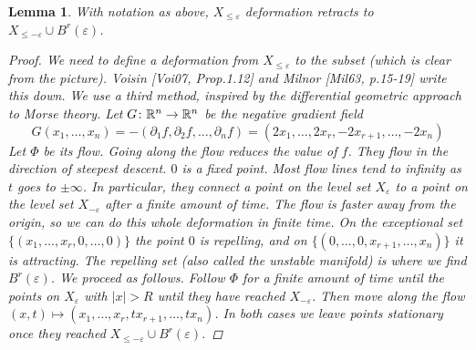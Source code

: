 \documentclass[A4paper, british]{amsart}
\theoremstyle{darkgreentheorem}
\newtheorem{lm}[thm]{Lemma}
\theoremstyle{darkbluedefinition}
\theoremstyle{darkredexample}
\theoremstyle{remark}
\newcommand{\1}{\mathbbm{1}}
\begin{document}
\begin{lm}
    With notation as above, $X_{\leqslant \varepsilon}$ deformation retracts to $X_{\leqslant -\varepsilon }\cup B^{r}(\varepsilon)$.
    \begin{proof}
	We need to define a deformation from $X_{\leqslant \varepsilon}$ to the subset (which is clear from the picture).
	Voisin [Voi07, Prop.1.12] and Milnor [Mil63, p.15-19] write this down.
	We use a third method, inspired by the differential geometric approach to Morse theory.
	Let $G\colon \mathbb{R}^{n}\to \mathbb{R}^{n}$ be the negative gradient field
	\[ G(x_{1},\ldots,x_{n})=-(\partial_{1} f,\partial_{2} f,\ldots, \partial_{n} f)=(2x_{1},\ldots,2x_{r},-2x_{r+1},\ldots,-2x_{n}) \]
	Let $\Phi$ be its flow.
	Going along the flow reduces the value of $f$.
	They flow in the direction of steepest descent.
	$0$ is a fixed point.
	Most flow lines tend to infinity as $t$ goes to $\pm \infty$.
	In particular, they connect a point on the level set $X_{\varepsilon}$ to a point on the level set $X_{-\varepsilon}$ after a finite amount of time.
	The flow is faster away from the origin, so we can do this whole deformation in finite time.
	On the exceptional set $\{(x_{1},\ldots,x_{r},0,\ldots,0)\}$ the point $0$ is repelling, and on $\{ (0,\ldots,0,x_{r+1},\ldots,x_{n})\}$ it is attracting.
	The repelling set (also called the \textit{unstable} manifold) is where we find $B^{r}(\varepsilon)$.
	We proceed as follows.
	Follow $\Phi$ for a finite amount of time until the points on $X_{\varepsilon}$ with $|x|>R$ until they have reached $X_{-\varepsilon}$.
	Then move along the flow $(x,t)\mapsto (x_{1},\ldots,x_{r},tx_{r+1},\ldots,tx_{n})$.
	In both cases we leave points stationary once they reached $X_{\leqslant -\varepsilon }\cup B^{r}(\varepsilon)$.
    \end{proof}
\end{lm}
\end{document}
